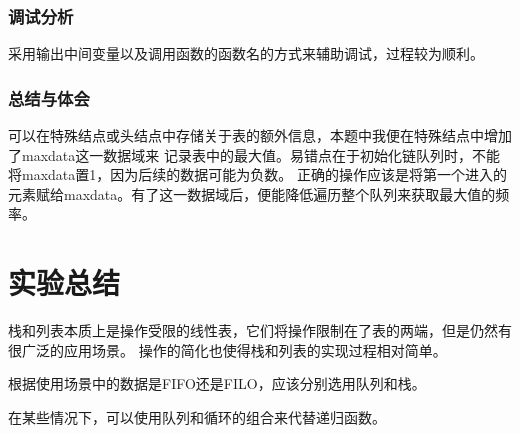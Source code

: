\documentclass[a4paper,11pt]{article}%
\begin{document}
\subsubsection{调试分析}
采用输出中间变量以及调用函数的函数名的方式来辅助调试，过程较为顺利。 
\subsubsection{总结与体会}
可以在特殊结点或头结点中存储关于表的额外信息，本题中我便在特殊结点中增加了maxdata这一数据域来
记录表中的最大值。易错点在于初始化链队列时，不能将maxdata置1，因为后续的数据可能为负数。
正确的操作应该是将第一个进入的元素赋给maxdata。有了这一数据域后，便能降低遍历整个队列来获取最大值的频率。
\section{实验总结}
栈和列表本质上是操作受限的线性表，它们将操作限制在了表的两端，但是仍然有很广泛的应用场景。
操作的简化也使得栈和列表的实现过程相对简单。

根据使用场景中的数据是FIFO还是FILO，应该分别选用队列和栈。

在某些情况下，可以使用队列和循环的组合来代替递归函数。
\end{document}
